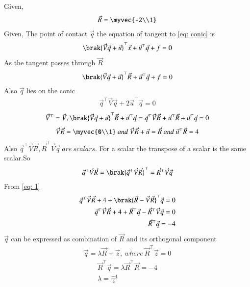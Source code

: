 \documentclass[journal]{IEEEtran}
\begin{document}
Given,
\begin{align}
\vec{R} = \myvec{-2\\1}
\end{align}
Given, The point of contact $\vec{q}$ the equation of tangent to \eqref{eq: conic} is
\begin{align}
\brak{\vec{V}\vec{q}+\vec{u}}^\top\vec{x} + \vec{u}^\top\vec{q} + f = 0
\end{align}
As the tangent passes through $\vec{R}$
\begin{align}
\brak{\vec{V}\vec{q}+\vec{u}}^\top\vec{R} + \vec{u}^\top\vec{q} + f = 0
\end{align}
Also $\vec{q}$ lies on the conic
\begin{align}
\vec{q}^\top\vec{V}\vec{q} + 2\vec{u}^\top\vec{q} = 0 \label{eq: 0}
\end{align}
\begin{align}
\vec{V}^\top = \vec{V} , \brak{\vec{V}\vec{q}+\vec{u}}^\top\vec{R} + \vec{u}^\top\vec{q} = \vec{q}^\top\vec{V}\vec{R} + \vec{u}^\top\vec{R} + \vec{u}^\top\vec{q} = 0 \label{eq: 1}
\end{align}
\begin{align}
\vec{V}\vec{R} = \myvec{0\\1} \ and \ \vec{V}\vec{R} + \vec{u} = \vec{R} \ and \ \vec{u}^\top\vec{R} = 4
\end{align}
Also
$
\vec{q}^\top\vec{V}\vec{R} , \vec{R}^\top\vec{V}\vec{q} \ are \ scalars.
$
For a scalar the transpose of a scalar is the same scalar.So
\begin{align}
\vec{q}^\top\vec{V}\vec{R} = \brak{\vec{q}^\top\vec{V}\vec{R}}^\top = \vec{R}^\top\vec{V}\vec{q}
\end{align}
From \eqref{eq: 1}
\begin{align}
\vec{q}^\top\vec{V}\vec{R} + 4 + \brak{\vec{R}-\vec{V}\vec{R}}^\top\vec{q} = 0 \\
\vec{q}^\top\vec{V}\vec{R} + 4 + \vec{R}^\top\vec{q} - \vec{R}^\top\vec{V}\vec{q} = 0 \\
\vec{R}^\top\vec{q} = -4
\end{align}
$\vec{q}$ can be expressed as combination of $\vec{R}$ and its orthogonal component
\begin{align}
\vec{q} = \lambda\vec{R} + \vec{z} , \ where \ \vec{R}^\top\vec{z} = 0 \label{eq: 2}
\end{align}
\begin{align}
\vec{R}^\top\vec{q} = \lambda\vec{R}^\top\vec{R} = -4 \\
\lambda = \frac{-4}{5}
\end{align}
\end{document}
